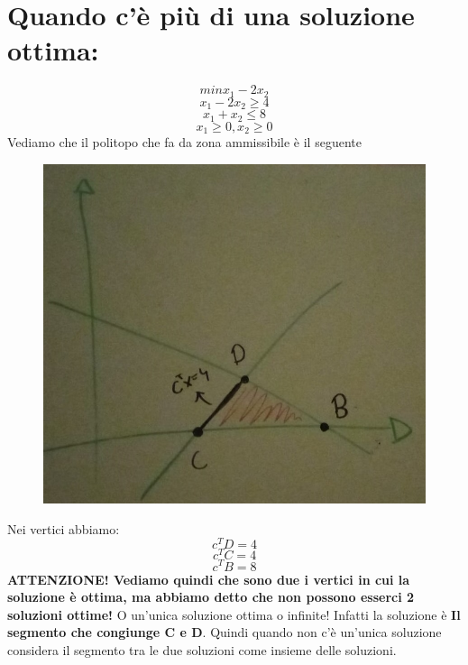 \section{Quando c'è più di una soluzione ottima:}
\begin{equation*}
    min x_1 - 2x_2
\end{equation*}
\begin{equation*}
    x_1 - 2x_2 \geq 4
\end{equation*}
\begin{equation*}
    x_1 + x_2 \leq 8
\end{equation*}
\begin{equation*}
    x_1 \geq 0, x_2 \geq 0
\end{equation*}
Vediamo che il politopo che fa da zona ammissibile è il seguente
\begin{figure}[h!]
    \centering
    \includegraphics[scale=0.3]{bho.jpeg}
\end{figure}
Nei vertici abbiamo:
\begin{equation*}
    c^TD = 4
\end{equation*}
\begin{equation*}
    c^TC = 4
\end{equation*}
\begin{equation*}
    c^TB = 8
\end{equation*}
\textbf{ATTENZIONE! Vediamo quindi che sono due i vertici in cui la soluzione è ottima, ma abbiamo detto che non possono esserci 2 soluzioni ottime!} O un'unica soluzione ottima o infinite! Infatti la soluzione è \textbf{Il segmento che congiunge C e D}. Quindi quando non c'è un'unica soluzione considera il segmento tra le due soluzioni come insieme delle soluzioni.


